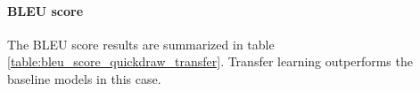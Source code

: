 
      \paragraph{BLEU score}
        The BLEU score results are summarized in table \ref{table:bleu_score_quickdraw_transfer}. Transfer learning outperforms the baseline models in this case.

